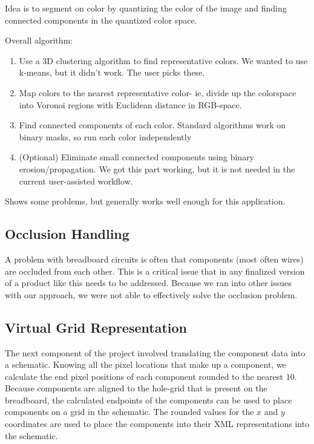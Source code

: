 \documentclass[10pt,twocolumn,letterpaper]{article}
\begin{document}
Idea is to segment on color by quantizing the color of the
image and finding connected components in the quantized color space.

Overall algorithm:
\begin{enumerate}
\item Use a 3D clustering algorithm to find representative colors. We
  wanted to use k-means, but it didn't work. The user picks these.
\item Map colors to the nearest representative color- ie, divide up
  the colorspace into Voronoi regions with Euclidean distance in
  RGB-space.
\item Find connected components of each color. Standard algorithms
  work on binary masks, so run each color independently
\item (Optional) Eliminate small connected components using binary
  erosion/propagation. We got this part working, but it is not needed
  in the current user-assisted workflow.
\end{enumerate}

Shows some problems, but generally works well enough for this application.

\subsection{Occlusion Handling}

A problem with breadboard circuits is often that components (most often wires)
are occluded from each other. This is a critical issue that in any finalized
version of a product like this needs to be addressed. Because we ran into other
issues with our approach, we were not able to effectively solve the occlusion
problem.  

\subsection{Virtual Grid Representation}

The next component of the project involved translating the component data into
a schematic. Knowing all the pixel locations that make up a component, we
calculate the end pixel positions of each component rounded to the nearest
$10$. Because components are aligned to the hole-grid that is present on the
breadboard, the calculated endpoints of the components can be used to place
components on a grid in the schematic. The rounded values for the $x$ and $y$
coordinates are used to place the components into their XML representations
into the schematic. 
\end{document}
